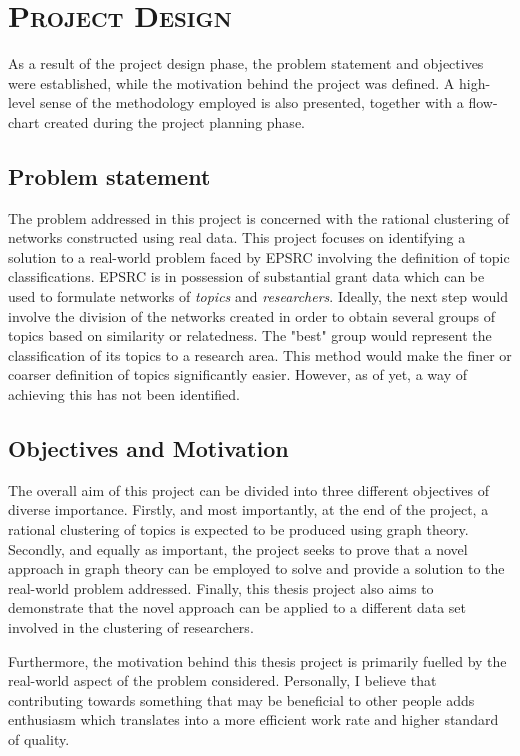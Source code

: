 \chapter{\textsc{Project Design}}
\label{chapter:project_design}

As a result of the project design phase, the problem statement and objectives were established, while the motivation behind the project was defined. A high-level sense of the methodology employed is also presented, together with a flow-chart created during the project planning phase.

\section{Problem statement}

The problem addressed in this project is concerned with the rational clustering of networks constructed using real data. This project focuses on identifying a solution to a real-world problem faced by EPSRC involving the definition of topic classifications. EPSRC is in possession of substantial grant data which can be used to formulate networks of \textit{topics} and \textit{researchers}. Ideally, the next step would involve the division of the networks created in order to obtain several groups of topics based on similarity or relatedness. The "best" group would represent the classification of its topics to a research area. This method would make the finer or coarser definition of topics significantly easier. However, as of yet, a way of achieving this has not been identified.

\section{Objectives and Motivation}

The overall aim of this project can be divided into three different objectives of diverse importance. Firstly, and most importantly, at the end of the project, a rational clustering of topics is expected to be produced using graph theory. Secondly, and equally as important, the project seeks to prove that a novel approach in graph theory can be employed to solve and provide a solution to the real-world problem addressed. Finally, this thesis project also aims to demonstrate that the novel approach can be applied to a different data set involved in the clustering of researchers.

Furthermore, the motivation behind this thesis project is primarily fuelled by the real-world aspect of the problem considered. Personally, I believe that contributing towards something that may be beneficial to other people adds enthusiasm which translates into a more efficient work rate and higher standard of quality.

